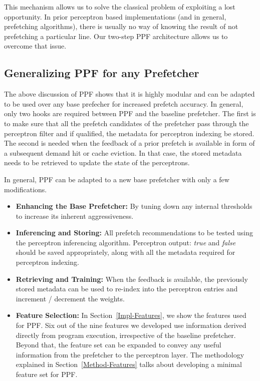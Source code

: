 This mechanism allows us to solve the classical problem of exploiting a lost
opportunity.  In prior perceptron based implementations (and in general,
prefetching algorithms), there is usually no way of knowing the result of not
prefetching a particular line.  Our two-step PPF architecture allows us to
overcome that issue.

\subsection{Generalizing PPF for any Prefetcher}
\label{Arch-Generalizing}
The above discussion of PPF shows that it is highly modular and can be
adapted to be used over any base prefecher for increased prefetch accuracy.
In general, only two hooks are required between PPF and the
baseline prefetcher. The first is to make sure that all the prefetch candidates of
the prefetcher pass through the perceptron filter and if qualified, the metadata for
perceptron indexing be stored. The second is needed when the feedback of a
prior prefetch is available in form of a subsequent demand hit or cache
eviction. In that case, the stored metadata needs to be retrieved to update
the state of the perceptrons.

In general, PPF can be adapted to a new base prefetcher with only a few modifications.
\begin{itemize}

\item \textbf{Enhancing the Base Prefetcher:} By tuning down any internal thresholds 
to increase its inherent aggressiveness. 

\item \textbf{Inferencing and Storing:} All prefetch recommendations to be
tested using the perceptron inferencing algorithm.  Perceptron output:
\textit{true} and \textit{false} should be saved appropriately, along with all
the metadata required for perceptron indexing.

\item \textbf{Retrieving and Training:} When the feedback is available, the
previously stored metadata can be used to re-index into the perceptron entries
and increment / decrement the weights.

\item \textbf{Feature Selection:} In Section~\ref{Impl-Features}, we show the features 
used for PPF. Six out of the nine features we developed
use information derived directly from program execution, irrespective of the baseline 
prefetcher. Beyond that, the feature set can be expanded to convey any
useful information from the prefetcher to the perceptron layer.  The 
methodology explained in Section~\ref{Method-Features} talks about developing a minimal 
feature set for PPF.

\end{itemize}
